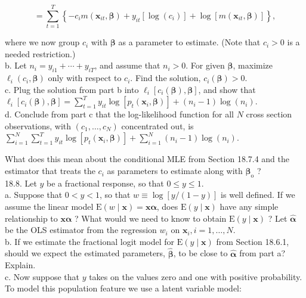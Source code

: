 \documentclass[10pt]{article}
\begin{document}
$$
=\sum_{t=1}^{T}\left\{-c_{i} m\left(\mathbf{x}_{i t}, \boldsymbol{\beta}\right)+y_{i t}\left[\log \left(c_{i}\right)\right]+\log \left[m\left(\mathbf{x}_{i t}, \boldsymbol{\beta}\right)\right]\right\},
$$

where we now group $c_{i}$ with $\boldsymbol{\beta}$ as a parameter to estimate. (Note that $c_{i}>0$ is a needed restriction.)\\
b. Let $n_{i}=y_{i 1}+\cdots+y_{i T}$, and assume that $n_{i}>0$. For given $\boldsymbol{\beta}$, maximize $\ell_{i}\left(c_{i}, \boldsymbol{\beta}\right)$ only with respect to $c_{i}$. Find the solution, $c_{i}(\boldsymbol{\beta})>0$.\\
c. Plug the solution from part b into $\ell_{i}\left[c_{i}(\boldsymbol{\beta}), \boldsymbol{\beta}\right]$, and show that\\
$\ell_{i}\left[c_{i}(\boldsymbol{\beta}), \boldsymbol{\beta}\right]=\sum_{t=1}^{T} y_{i t} \log \left[p_{t}\left(\mathbf{x}_{i}, \boldsymbol{\beta}\right)\right]+\left(n_{i}-1\right) \log \left(n_{i}\right)$.\\
d. Conclude from part c that the log-likelihood function for all $N$ cross section observations, with $\left(c_{1}, \ldots, c_{N}\right)$ concentrated out, is\\
$\sum_{i=1}^{N} \sum_{t=1}^{T} y_{i t} \log \left[p_{t}\left(\mathbf{x}_{i}, \boldsymbol{\beta}\right)\right]+\sum_{i=1}^{N}\left(n_{i}-1\right) \log \left(n_{i}\right)$.

What does this mean about the conditional MLE from Section 18.7.4 and the estimator that treats the $c_{i}$ as parameters to estimate along with $\boldsymbol{\beta}_{\mathrm{o}}$ ?\\
18.8. Let $y$ be a fractional response, so that $0 \leq y \leq 1$.\\
a. Suppose that $0<y<1$, so that $w \equiv \log [y /(1-y)]$ is well defined. If we assume the linear model $\mathrm{E}(w \mid \mathbf{x})=\mathbf{x} \boldsymbol{\alpha}$, does $\mathrm{E}(y \mid \mathbf{x})$ have any simple relationship to $\mathbf{x} \boldsymbol{\alpha}$ ? What would we need to know to obtain $\mathrm{E}(y \mid \mathbf{x})$ ? Let $\hat{\boldsymbol{\alpha}}$ be the OLS estimator from the regression $w_{i}$ on $\mathbf{x}_{i}, i=1, \ldots, N$.\\
b. If we estimate the fractional logit model for $\mathrm{E}(y \mid \mathbf{x})$ from Section 18.6.1, should we expect the estimated parameters, $\hat{\boldsymbol{\beta}}$, to be close to $\hat{\boldsymbol{\alpha}}$ from part a? Explain.\\
c. Now suppose that $y$ takes on the values zero and one with positive probability. To model this population feature we use a latent variable model:
\end{document}
